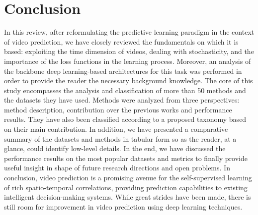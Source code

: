 \section{Conclusion}
\label{sec:conclusion}
In this review, after reformulating the predictive learning paradigm in the context of video prediction, we have closely reviewed the fundamentals on which it is based: exploiting the time dimension of videos, dealing with stochasticity, and the importance of the loss functions in the learning process. Moreover, an analysis of the backbone deep learning-based architectures for this task was performed in order to provide the reader the necessary background knowledge. The core of this study encompasses the analysis and classification of more than 50 methods and the datasets they have used. Methods were analyzed from three perspectives: method description, contribution over the previous works and performance results. They have also been classified according to a proposed taxonomy based on their main contribution. In addition, we have presented a comparative summary of the datasets and methods in tabular form so as the reader, at a glance, could identify low-level details. In the end, we have discussed the performance results on the most popular datasets and metrics to finally provide useful insight in shape of future research directions and open problems. In conclusion, video prediction is a promising avenue for the self-supervised learning of rich spatio-temporal correlations, providing prediction capabilities to existing intelligent decision-making systems. While great strides have been made, there is still room for improvement in video prediction using deep learning techniques.
